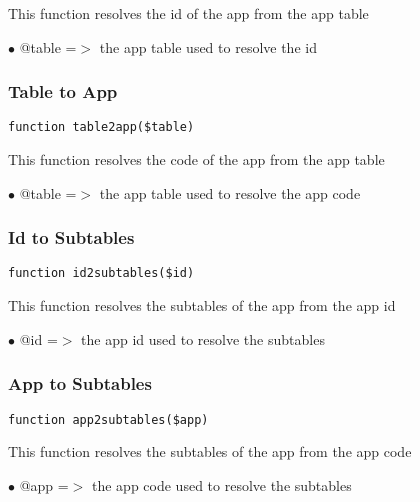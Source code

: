 \documentclass[a4paper]{article}
\begin{document}
This function resolves the id of the app from the app table

\begin{compactitem}
\item[\color{myblue}$\bullet$] @table =$>$ the app table used to resolve the id
\end{compactitem}

\hypertarget{toc22}{}
\subsubsection{Table to App}

\begin{lstlisting}
function table2app($table)
\end{lstlisting}

This function resolves the code of the app from the app table

\begin{compactitem}
\item[\color{myblue}$\bullet$] @table =$>$ the app table used to resolve the app code
\end{compactitem}

\hypertarget{toc23}{}
\subsubsection{Id to Subtables}

\begin{lstlisting}
function id2subtables($id)
\end{lstlisting}

This function resolves the subtables of the app from the app id

\begin{compactitem}
\item[\color{myblue}$\bullet$] @id =$>$ the app id used to resolve the subtables
\end{compactitem}

\hypertarget{toc24}{}
\subsubsection{App to Subtables}

\begin{lstlisting}
function app2subtables($app)
\end{lstlisting}

This function resolves the subtables of the app from the app code

\begin{compactitem}
\item[\color{myblue}$\bullet$] @app =$>$ the app code used to resolve the subtables
\end{compactitem}
\end{document}

